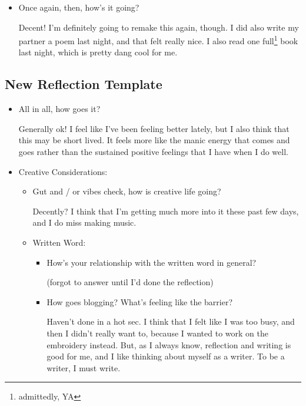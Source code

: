 \documentclass[12pt]{article}
\renewcommand{\,}{\textsuperscript{,}}
\begin{document}
\begin{itemize}
\begin{itemize}
\end{itemize}

\item Once again, then, how's it going?

Decent! I'm definitely going to remake this again, though. I did also write my partner a poem last night, and that felt really nice. I also read one full\footnote{admittedly, YA} book last night, which is pretty dang cool for me.

\end{itemize}

\subsection{New Reflection Template}

\begin{itemize}

\item All in all, how goes it?

Generally ok! I feel like I've been feeling better lately, but I also think that this may be short lived. It feels more like the manic energy that comes and goes rather than the sustained positive feelings that I have when I do well.

\item Creative Considerations:

\begin{itemize}

\item Gut and / or vibes check, how is creative life going?

Decently? I think that I'm getting much more into it these past few days, and I do miss making music.

\item Written Word:

\begin{itemize}

\item How's your relationship with the written word in general?

(forgot to answer until I'd done the reflection)

\item How goes blogging? What's feeling like the barrier?

Haven't done in a hot sec. I think that I felt like I was too busy, and then I didn't really want to, because I wanted to work on the embroidery instead.  
But, as I always know, reflection and writing is good for me, and I like thinking about myself as a writer.  
To be a writer, I must write.


\end{itemize}
\end{itemize}
\end{itemize}
\end{document}
